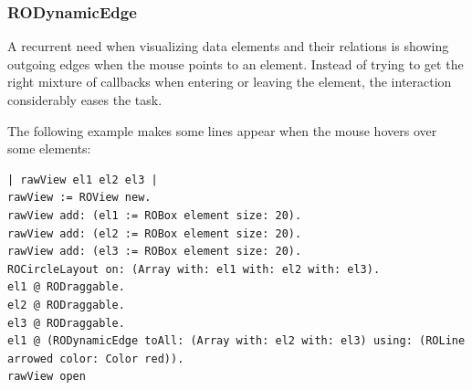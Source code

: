 \documentclass[a4paper,10pt,twoside]{book}
\begin{document}
%
%	


%
%

\subsubsection{RODynamicEdge} A recurrent need when visualizing data elements and their relations is showing outgoing edges when the mouse points to an element. Instead of trying to get the right mixture of callbacks when entering or leaving the element, the interaction  considerably eases the task.

The following example makes some lines appear when the mouse hovers over some elements:

\begin{lstlisting}
| rawView el1 el2 el3 |
rawView := ROView new.
rawView add: (el1 := ROBox element size: 20).
rawView add: (el2 := ROBox element size: 20).
rawView add: (el3 := ROBox element size: 20).
ROCircleLayout on: (Array with: el1 with: el2 with: el3).
el1 @ RODraggable.
el2 @ RODraggable.
el3 @ RODraggable.
el1 @ (RODynamicEdge toAll: (Array with: el2 with: el3) using: (ROLine arrowed color: Color red)).
rawView open
\end{lstlisting}
\end{document}
